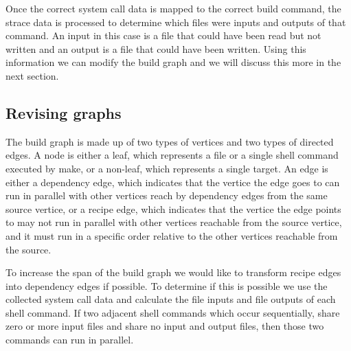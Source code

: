 \documentclass[twocolumn,acmtog,10pt,review]{acmart}
\begin{document}
Once the correct system call data is mapped to the correct build command, the strace data is
processed to determine which files were inputs and outputs of that command.  An input in this case
is a file that could have been read but not written and an output is a file that could have been
written.  Using this information we can modify the build graph and we will discuss this more
in the next section.




\subsection{Revising graphs}
\label{sec:revisegraphs}

The build graph is made up of two types of vertices and two types of directed edges.  A node is
either a leaf, which represents a file or a single shell command executed by make, or a non-leaf,
which represents a single target.  An edge is either a dependency edge, which indicates that the
vertice the edge goes to can run in parallel with other vertices reach by dependency edges from the
same source vertice, or a recipe edge, which indicates that the vertice the edge points to may not
run in parallel with other vertices reachable from the source vertice, and it must run in a
specific order relative to the other vertices reachable from the source.

To increase the span of the build graph we would like to transform recipe edges into dependency
edges if possible.  To determine if this is possible we use the collected system call data and
calculate the file inputs and file outputs of each shell command.  If two adjacent shell commands
which occur sequentially, share zero or more input files and share no input and output files, then
those two commands can run in parallel.
\end{document}
